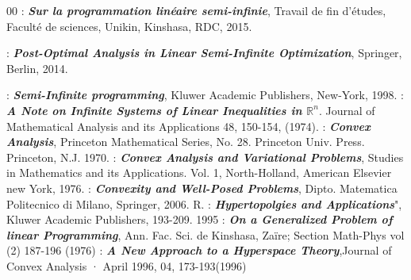 \documentclass[11pt]{report}
\theoremstyle{styletheorem}
\theoremstyle{styledef}
\theoremstyle{remark}
\newcommand{\R}{\ensuremath{\mathbb{R}}}
\begin{document}
\begin{thebibliography}{00}
		  : \textbf{\textit{Sur la programmation linéaire semi-infinie}}, Travail de fin d'études, Faculté de sciences, Unikin, Kinshasa, RDC, 2015.
		
		 : \textbf{\textit{Post-Optimal Analysis in Linear Semi-Infinite Optimization}}, Springer, Berlin, 2014.
		
		
		 : \textbf{\textit{Semi-Infinite programming}}, Kluwer Academic Publishers, New-York, 1998.
		 : \textbf{\textit{A Note on Infinite Systems of Linear Inequalities in $\R^n$}}. Journal of Mathematical Analysis and its Applications 48, 150-154, (1974).
		 : \textbf{\textit{Convex Analysis}}, Princeton Mathematical Series, No. 28. Princeton Univ. Press. Princeton, N.J. 1970.
		 : \textbf{\textit{Convex Analysis and Variational Problems}}, Studies in Mathematics and its Applications. Vol. 1, North-Holland, American Elsevier new York, 1976.
		 : \textbf{\textit{Convexity and Well-Posed Problems}}, Dipto. Matematica Politecnico di Milano, Springer, 2006.	
		R. : \textbf{\textit{Hypertopolgies and Applications}}", Kluwer Academic Publishers, 193-209. 1995
		  : \textbf{\textit{On a Generalized Problem of linear Programming}}, Ann. Fac. Sci. de Kinshasa, Zaïre; Section Math-Phys vol (2) 187-196 (1976)
		 : \textbf{\textit{A New Approach to a Hyperspace Theory}},Journal of Convex Analysis · April 1996, 04, 173-193(1996)
	\end{thebibliography}
	\vspace{12pt}
	
	
	
	
	
	
	
	
	
	
	
	
	
	
	
	
		
		
		

 
 
\end{document}
